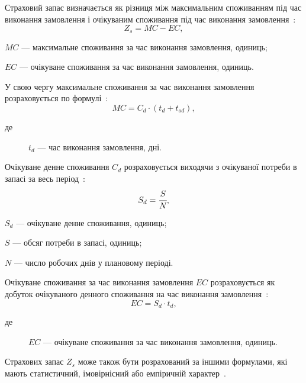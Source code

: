 Страховий запас визначається як різниця між максимальним споживанням під час виконання замовлення і очікуваним споживання під час виконання замовлення~\cite{Sterligova2008}:
\begin{equation} \label{eq:model_fs:zs2}
Z_s=MC-EC
,
\end{equation}
\begin{description}
	\item[де] $MC$ --- максимальне споживання за час виконання замовлення, одиниць;
	\item $EC$ --- очікуване споживання за час виконання замовлення, одиниць.
\end{description}

У свою чергу максимальне споживання за час виконання замовлення розраховується по формулі~\cite{Sterligova2008}:
\begin{equation}
MC=C_d\cdot(t_d+t_{od})
,
\end{equation}
\begin{description}
	\item[де] $t_d$ --- час виконання замовлення, дні.
\end{description}

Очікуване денне споживання $C_d$ розраховується виходячи з очікуваної потреби в запасі за весь період~\cite{Sterligova2008}:
\begin{equation}
S_d=\cfrac{S}{N}
,
\end{equation}
\begin{description}
	\item[де] $S_d$ --- очікуване денне споживання, одиниць;
	\item $S$ --- обсяг потреби в запасі, одиниць;
	\item $N$ --- число робочих днів у плановому періоді.
\end{description}

Очікуване споживання за час виконання замовлення $EC$ розраховується як добуток очікуваного денного споживання на час виконання замовлення~\cite{Sterligova2008}:
\begin{equation}
EC=S_d\cdot t_d
,
\end{equation}
\begin{description}
	\item[де] $EC$ --- очікуване споживання за час виконання замовлення, одиниць.
\end{description}

Страхових запас $Z_s$ може також бути розрахований за іншими формулами, які мають статистичний, імовірнісний або емпіричній характер~\cite{Sterligova2008}.

